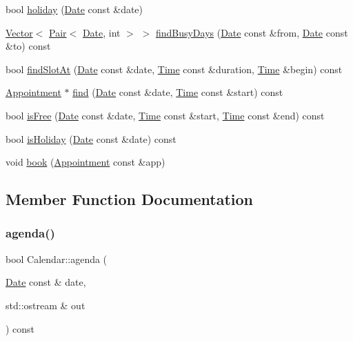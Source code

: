 \begin{DoxyCompactItemize}
\item 
bool \hyperlink{classCalendar_aa54f943234aebe06350ae6545804dd0a}{holiday} (\hyperlink{classDate}{Date} const \&date)
\item 
\hyperlink{classVector}{Vector}$<$ \hyperlink{structPair}{Pair}$<$ \hyperlink{classDate}{Date}, int $>$ $>$ \hyperlink{classCalendar_a33727e15bb2186dbdc1fe227dfa0a6e6}{find\+Busy\+Days} (\hyperlink{classDate}{Date} const \&from, \hyperlink{classDate}{Date} const \&to) const
\item 
bool \hyperlink{classCalendar_aecc060737b760817e814121df59a9316}{find\+Slot\+At} (\hyperlink{classDate}{Date} const \&date, \hyperlink{classTime}{Time} const \&duration, \hyperlink{classTime}{Time} \&begin) const
\item 
\hyperlink{classAppointment}{Appointment} $\ast$ \hyperlink{classCalendar_a249805cf48297698e30512ff9a47bac3}{find} (\hyperlink{classDate}{Date} const \&date, \hyperlink{classTime}{Time} const \&start) const
\item 
bool \hyperlink{classCalendar_abd5c6a36628d47bae770f807254fb639}{is\+Free} (\hyperlink{classDate}{Date} const \&date, \hyperlink{classTime}{Time} const \&start, \hyperlink{classTime}{Time} const \&end) const
\item 
bool \hyperlink{classCalendar_ae1d1e8979866bb2d03c4e66d801fdebf}{is\+Holiday} (\hyperlink{classDate}{Date} const \&date) const
\item 
void \hyperlink{classCalendar_a1dbd9019e73644ee8bf5611884ac5d75}{book} (\hyperlink{classAppointment}{Appointment} const \&app)
\end{DoxyCompactItemize}


\subsection{Member Function Documentation}
\mbox{\label{classCalendar_ac6112aa4e9b3e6e5b9a478ff66789d77}} 
\subsubsection{\texorpdfstring{agenda()}{agenda()}}
{\footnotesize\ttfamily bool Calendar\+::agenda (\begin{DoxyParamCaption}\item[{\hyperlink{classDate}{Date} const \&}]{date,  }\item[{std\+::ostream \&}]{out }\end{DoxyParamCaption}) const}

